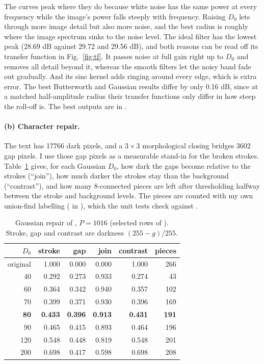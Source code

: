 The curves peak where they do because white noise has the same power at every
frequency while the image's power falls steeply with frequency. Raising $D_0$
lets through more image detail but also more noise, and the best radius is
roughly where the image spectrum sinks to the noise level. The ideal filter has
the lowest peak (28.69 dB against 29.72 and 29.56 dB), and both reasons can be
read off its transfer function in Fig.~\ref{fig:tf}. It passes noise at full
gain right up to $D_0$ and removes all detail beyond it, whereas the smooth
filters let the noisy band fade out gradually. And its sinc kernel adds ringing
around every edge, which is extra error. The best Butterworth and Gaussian
results differ by only 0.16 dB, since at a matched half-amplitude radius their
transfer functions only differ in how steep the roll-off is. The best outputs
are in .

\paragraph{(b) Character repair.} The text has 17766 dark pixels, and a
$3\times3$ morphological closing bridges 3602 gap pixels. I use those gap pixels
as a measurable stand-in for the broken strokes. Table~\ref{tab:text} gives, for
each Gaussian $D_0$, how dark the gaps become relative to the strokes
(``join''), how much darker the strokes stay than the background
(``contrast''), and how many 8-connected pieces are left after thresholding
halfway between the stroke and background levels. The pieces are counted with
my own union-find labelling ( in
), which the unit tests check against
.

\begin{table}[H]
\centering
\begin{tabular}{rrrrrr}
\toprule
$D_0$ & stroke & gap & join & contrast & pieces\\
\midrule
original & 1.000 & 0.000 & 0.000 & 1.000 & 266\\
40 & 0.292 & 0.273 & 0.933 & 0.274 & 43\\
60 & 0.364 & 0.342 & 0.940 & 0.357 & 102\\
70 & 0.399 & 0.371 & 0.930 & 0.396 & 169\\
\textbf{80} & \textbf{0.433} & \textbf{0.396} & \textbf{0.913} & \textbf{0.431} & \textbf{191}\\
90 & 0.465 & 0.415 & 0.893 & 0.464 & 196\\
120 & 0.548 & 0.448 & 0.819 & 0.548 & 201\\
200 & 0.698 & 0.417 & 0.598 & 0.698 & 208\\
\bottomrule
\end{tabular}
\caption{Gaussian repair of , $P=1016$ (selected rows of
). Stroke, gap and contrast are darkness
$(255-g)/255$.}
\label{tab:text}
\end{table}

